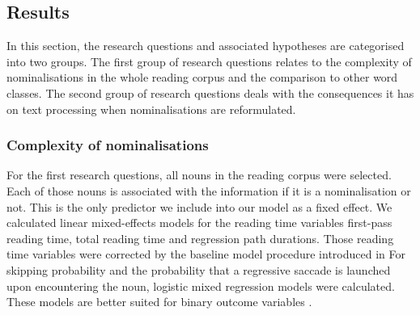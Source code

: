 \documentclass[output=paper]{langsci/langscibook}
\begin{document}
\subsection{\label{bkm:Ref283726141}Results}

In this section, the research questions and associated hypotheses are categorised into two groups. The first group of research questions relates to the complexity of nominalisations in the whole reading corpus and the comparison to other word classes. The second group of research questions deals with the consequences it has on text processing when nominalisations are reformulated. 

\subsubsection{Complexity of nominalisations}

For the first research questions, all nouns in the reading corpus were selected. Each of those nouns is associated with the information if it is a nominalisation or not. This is the only predictor we include into our model as a fixed effect. We calculated linear mixed-effects models for the reading time variables first-pass reading time, total reading time and regression path durations. Those reading time variables were corrected by the baseline model procedure introduced in  For skipping probability and the probability that a regressive saccade is launched upon encountering the noun, logistic mixed regression models were calculated. These models are better suited for binary outcome variables \citep[cf. ][]{Jaeger2008}.
\end{document}
